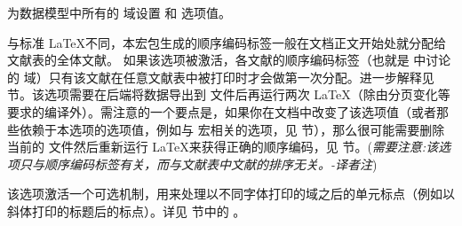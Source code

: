 \begin{optionlist}

为数据模型中所有的  域设置  和  选项值。


与标准 \LaTeX 不同，本宏包生成的顺序编码标签一般在文档正文开始处就分配给文献表的全体文献。
如果该选项被激活，各文献的顺序编码标签（也就是  中讨论的  域）只有该文献在任意文献表中被打印时才会做第一次分配。进一步解释见  节。该选项需要在后端将数据导出到  文件后再运行两次 \LaTeX （除由分页变化等要求的编译外）。需注意的一个要点是，如果你在文档中改变了该选项值（或者那些依赖于本选项的选项值，例如与 宏相关的选项，见 节），那么很可能需要删除当前的  文件然后重新运行 \LaTeX 来获得正确的顺序编码，见  节。(\emph{需要注意:该选项只与顺序编码标签有关，而与文献表中文献的排序无关。-译者注})


该选项激活一个可选机制，用来处理以不同字体打印的域之后的单元标点（例如以斜体打印的标题后的标点）。详见  节中的 。


\end{optionlist}
